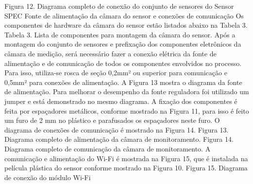 Figura 12. Diagrama completo de conexão do conjunto de sensores do Sensor SPEC
Fonte de alimentação da câmara do sensor e conexões de comunicação
Os componentes de hardware da câmara do sensor estão listados abaixo na Tabela 3.
Tabela 3. Lista de componentes para montagem da câmara do sensor.
Após a montagem do conjunto de sensores e prefixação dos componentes eletrônicos da câmara de medição, será necessário fazer a conexão elétrica da fonte de alimentação e de comunicação de todos os componentes envolvidos no processo. Para isso, utiliza-se rosca de seção 0,2mm² ou superior para comunicação e 0,5mm² para conexões de alimentação.
A Figura 13 mostra o diagrama da fonte de alimentação. Para melhorar o desempenho da fonte reguladora foi utilizado um jumper e está demonstrado no mesmo diagrama.
A fixação dos componentes é feita por espaçadores metálicos, conforme mostrado na Figura 11, para isso é feito um furo de 2 mm no plástico e parafusados os espaçadores neste furo.
O diagrama de conexões de comunicação é mostrado na Figura 14.
Figura 13. Diagrama completo de alimentação da câmara de monitoramento.
Figura 14. Diagrama completo de comunicação da câmara de monitoramento.
A comunicação e alimentação do Wi-Fi é mostrada na Figura 15, que é instalada na película plástica do sensor conforme mostrado na Figura 10.
Figura 15. Diagrama de conexão do módulo Wi-Fi

